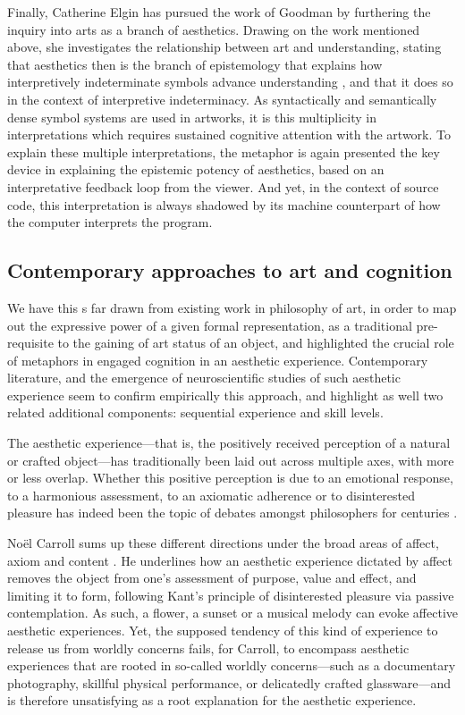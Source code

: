 Finally, Catherine Elgin has pursued the work of Goodman by furthering the inquiry into arts as a branch of aesthetics. Drawing on the work mentioned above, she investigates the relationship between art and understanding, stating that aesthetics then is the branch of epistemology that explains how interpretively indeterminate symbols advance understanding \citep{elgin_understanding_2020}, and that it does so in the context of interpretive indeterminacy. As syntactically and semantically dense symbol systems are used in artworks,  it is this multiplicity in interpretations which requires sustained cognitive attention with the artwork. To explain these multiple interpretations, the metaphor is again presented the key device in explaining the epistemic potency of aesthetics, based on an interpretative feedback loop from the viewer. And yet, in the context of source code, this interpretation is always shadowed by its machine counterpart of how the computer interprets the program.

\subsection{Contemporary approaches to art and cognition}
\label{subsec:art-cognition-contemporary}

We have this s far drawn from existing work in philosophy of art, in order to map out the expressive power of a given formal representation, as a traditional pre-requisite to the gaining of art status of an object, and highlighted the crucial role of metaphors in engaged cognition in an aesthetic experience. Contemporary literature, and the emergence of neuroscientific studies of such aesthetic experience seem to confirm empirically this approach, and highlight as well two related additional components: sequential experience and skill levels.

The aesthetic experience—that is, the positively received perception of a natural or crafted object—has traditionally been laid out across multiple axes, with more or less overlap. Whether this positive perception is due to an emotional response, to a harmonious assessment, to an axiomatic adherence or to disinterested pleasure has indeed been the topic of debates amongst philosophers for centuries \citep{peacocke_aesthetic_2023}.

Noël Carroll sums up these different directions under the broad areas of affect, axiom and content \citep{carroll_aesthetic_2002}. He underlines how an aesthetic experience dictated by affect removes the object from one's assessment of purpose, value and effect, and limiting it to form, following Kant's principle of disinterested pleasure via passive contemplation. As such, a flower, a sunset or a musical melody can evoke affective aesthetic experiences. Yet, the supposed tendency of this kind of experience to release us from worldly concerns fails, for Carroll, to encompass aesthetic experiences that are rooted in so-called worldly concerns—such as a documentary photography, skillful physical performance, or delicatedly crafted glassware—and is therefore unsatisfying as a root explanation for the aesthetic experience.

